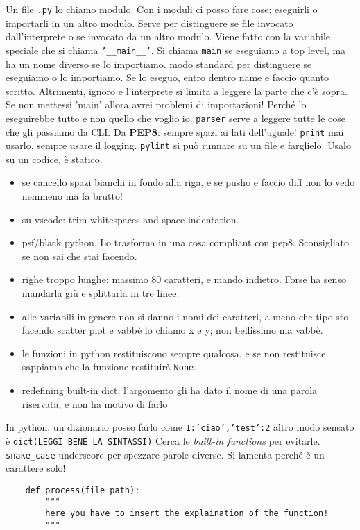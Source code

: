 \documentclass[10pt, a4paper, twosided, titlepage, draft]{book}
\begin{document}
Un file \texttt{.py} lo chiamo modulo. Con i moduli ci posso fare cose: eseguirli o importarli in un altro modulo.
Serve per distinguere se file invocato dall'interprete o se invocato da un altro modulo. Viene fatto con la variabile speciale che si chiama \texttt{'__main__'}. 
Si chiama \texttt{main} se eseguiamo a top level, ma ha un nome diverso se lo importiamo.
modo standard per distinguere se eseguiamo o lo importiamo.
Se lo eseguo, entro dentro name e faccio quanto scritto. Altrimenti, ignoro e l'interprete si limita a leggere la parte che c'è sopra.
Se non mettessi 'main' allora avrei problemi di importazioni! Perché lo eseguirebbe tutto e non quello che voglio io.
\texttt{parser} serve a leggere tutte le cose che gli passiamo da  CLI. 
Da \textbf{PEP8}: sempre spazi ai lati dell'uguale!
\texttt{print} mai usarlo, sempre usare il logging.
\texttt{pylint} si può runnare su un file e farglielo. Usalo su un codice, è statico.
\begin{itemize}
	\item se cancello spazi bianchi in fondo alla riga, e se pusho e faccio diff non lo vedo nemmeno ma fa brutto!
	\item su vscode: trim whitespaces and space indentation.
	\item psf/black python. Lo trasforma in una cosa compliant con pep8. Sconsigliato se non sai che stai facendo.
	\item righe troppo lunghe: massimo 80 caratteri, e mando indietro. Forse ha senso mandarla giù e splittarla in tre linee.
	\item alle variabili in genere non si danno i nomi dei caratteri, a meno che tipo sto facendo scatter plot e vabbè lo chiamo x e y; non bellissimo ma vabbè.
	\item le funzioni in python restituiscono sempre qualcosa, e se non restituisce sappiamo che la funzione restituirà \texttt{None}.
	\item redefining built-in dict: l'argomento gli ha dato il nome di una parola riservata, e non ha motivo di farlo
 
\end{itemize}

In python, un dizionario posso farlo come \texttt{{1:'ciao','test':2}}
altro modo sensato è \texttt{dict(LEGGI BENE LA SINTASSI)}
Cerca le \textit{built-in functions} per evitarle.
\texttt{snake_case} underscore per spezzare parole diverse. Si lamenta perché è un carattere solo!
\begin{verbatim}
	def process(file_path):
		"""
		here you have to insert the explaination of the function!
		"""
\end{verbatim}
\end{document}

